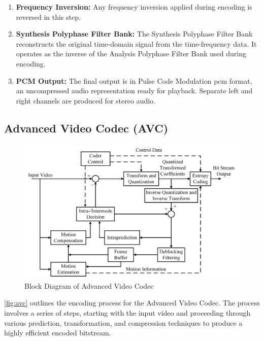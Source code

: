 \documentclass{ioereport}
\begin{document}
\begin{enumerate}[label=\textbf{\roman*.}]
            \item \textbf{Frequency Inversion:}  
            Any frequency inversion applied during encoding is reversed in this step.
        
            \item \textbf{Synthesis Polyphase Filter Bank:}  
            The Synthesis Polyphase Filter Bank reconstructs the original time-domain signal from the time-frequency data. It operates as the inverse of the Analysis Polyphase Filter Bank used during encoding.
        
            \item \textbf{PCM Output:}  
            The final output is in Pulse Code Modulation \gls{pcm} format, an uncompressed audio representation ready for playback. Separate left and right channels are produced for stereo audio.
        \end{enumerate}
        
    \subsection{Advanced Video Codec (AVC) }
        \begin{figure}[H]
        \centering
        \includegraphics[width=0.95\linewidth]{assets/h264_blockdiagram.png}
        \caption{Block Diagram of Advanced Video Codec}
        \label{fig:avc}
    \end{figure}

    \autoref{fig:avc} outlines the encoding process for the Advanced Video Codec. The process involves a series of steps, starting with the input video and proceeding through various prediction, transformation, and compression techniques to produce a highly efficient encoded bitstream. 
\end{document}
